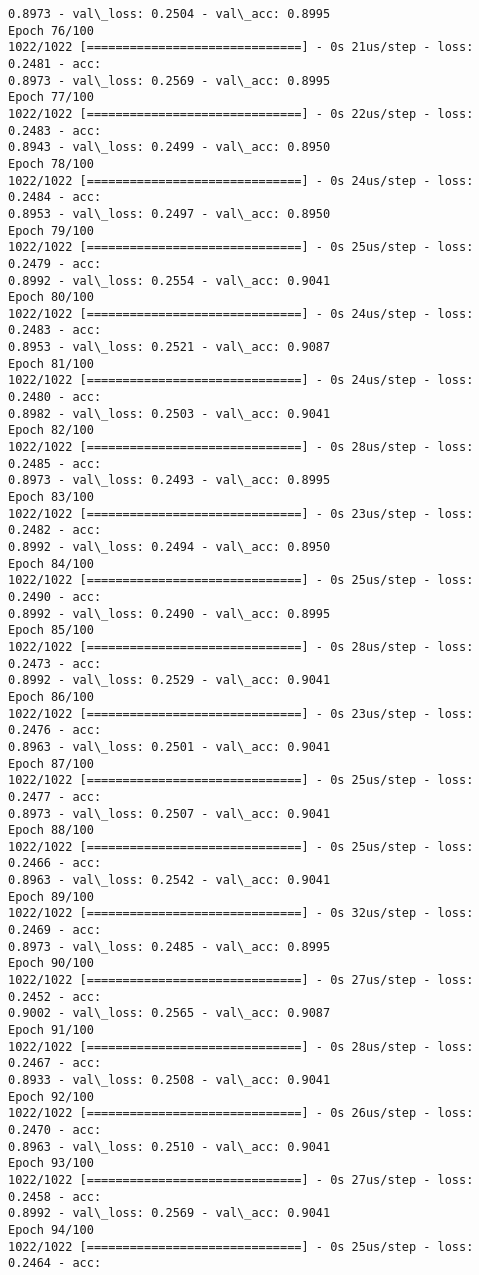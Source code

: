 \documentclass[11pt]{article}
\begin{document}
\begin{Verbatim}[commandchars=\\\{\}]
0.8973 - val\_loss: 0.2504 - val\_acc: 0.8995
Epoch 76/100
1022/1022 [==============================] - 0s 21us/step - loss: 0.2481 - acc:
0.8973 - val\_loss: 0.2569 - val\_acc: 0.8995
Epoch 77/100
1022/1022 [==============================] - 0s 22us/step - loss: 0.2483 - acc:
0.8943 - val\_loss: 0.2499 - val\_acc: 0.8950
Epoch 78/100
1022/1022 [==============================] - 0s 24us/step - loss: 0.2484 - acc:
0.8953 - val\_loss: 0.2497 - val\_acc: 0.8950
Epoch 79/100
1022/1022 [==============================] - 0s 25us/step - loss: 0.2479 - acc:
0.8992 - val\_loss: 0.2554 - val\_acc: 0.9041
Epoch 80/100
1022/1022 [==============================] - 0s 24us/step - loss: 0.2483 - acc:
0.8953 - val\_loss: 0.2521 - val\_acc: 0.9087
Epoch 81/100
1022/1022 [==============================] - 0s 24us/step - loss: 0.2480 - acc:
0.8982 - val\_loss: 0.2503 - val\_acc: 0.9041
Epoch 82/100
1022/1022 [==============================] - 0s 28us/step - loss: 0.2485 - acc:
0.8973 - val\_loss: 0.2493 - val\_acc: 0.8995
Epoch 83/100
1022/1022 [==============================] - 0s 23us/step - loss: 0.2482 - acc:
0.8992 - val\_loss: 0.2494 - val\_acc: 0.8950
Epoch 84/100
1022/1022 [==============================] - 0s 25us/step - loss: 0.2490 - acc:
0.8992 - val\_loss: 0.2490 - val\_acc: 0.8995
Epoch 85/100
1022/1022 [==============================] - 0s 28us/step - loss: 0.2473 - acc:
0.8992 - val\_loss: 0.2529 - val\_acc: 0.9041
Epoch 86/100
1022/1022 [==============================] - 0s 23us/step - loss: 0.2476 - acc:
0.8963 - val\_loss: 0.2501 - val\_acc: 0.9041
Epoch 87/100
1022/1022 [==============================] - 0s 25us/step - loss: 0.2477 - acc:
0.8973 - val\_loss: 0.2507 - val\_acc: 0.9041
Epoch 88/100
1022/1022 [==============================] - 0s 25us/step - loss: 0.2466 - acc:
0.8963 - val\_loss: 0.2542 - val\_acc: 0.9041
Epoch 89/100
1022/1022 [==============================] - 0s 32us/step - loss: 0.2469 - acc:
0.8973 - val\_loss: 0.2485 - val\_acc: 0.8995
Epoch 90/100
1022/1022 [==============================] - 0s 27us/step - loss: 0.2452 - acc:
0.9002 - val\_loss: 0.2565 - val\_acc: 0.9087
Epoch 91/100
1022/1022 [==============================] - 0s 28us/step - loss: 0.2467 - acc:
0.8933 - val\_loss: 0.2508 - val\_acc: 0.9041
Epoch 92/100
1022/1022 [==============================] - 0s 26us/step - loss: 0.2470 - acc:
0.8963 - val\_loss: 0.2510 - val\_acc: 0.9041
Epoch 93/100
1022/1022 [==============================] - 0s 27us/step - loss: 0.2458 - acc:
0.8992 - val\_loss: 0.2569 - val\_acc: 0.9041
Epoch 94/100
1022/1022 [==============================] - 0s 25us/step - loss: 0.2464 - acc:

\end{Verbatim}
\end{document}
